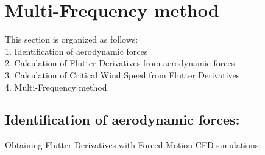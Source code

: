 \documentclass[a4paper, 12pt]{report}
\begin{document}
\section*{Multi-Frequency method}

\begin{flushleft}
This section is organized as follows: \\
\hspace{2cm}1. Identification of aerodynamic forces \\
\hspace{2cm}2. Calculation of Flutter Derivatives from aerodynamic forces \\
\hspace{2cm}3. Calculation of Critical Wind Speed from Flutter Derivatives \\
\hspace{2cm}4. Multi-Frequency method \\
\end{flushleft}

\subsection*{Identification of aerodynamic forces:}

Obtaining Flutter Derivatives with Forced-Motion CFD simulations:
\end{document}

